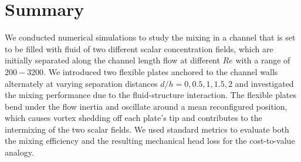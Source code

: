 \documentclass[reprint,a4paper,fleqn]{cas-dc} %
\begin{document}

		
		\section{Summary}

		We conducted numerical simulations to study the mixing in a channel that is set to be filled with fluid of two different scalar concentration fields, which are initially separated along the channel length flow at different $Re$ with a range of $200-3200$. We introduced two flexible plates anchored to the channel walls alternately at varying separation distances $d/h=0,0.5,1,1.5,2$ and investigated the mixing performance due to the fluid-structure interaction. The flexible plates bend under the flow inertia and oscillate around a mean reconfigured position, which causes vortex shedding off each plate's tip and contributes to the intermixing of the two scalar fields. We used standard metrics to evaluate both the mixing efficiency and the resulting mechanical head loss for the cost-to-value analogy.
\end{document}
